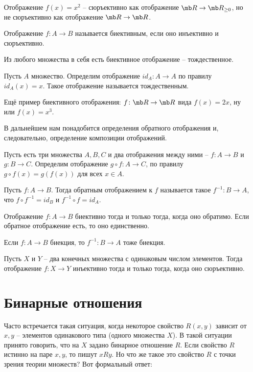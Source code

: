Отображение $f(x)=x^2$ -- сюръективно как отображение $\mb R \to \mb R_{\geq 0}$, но не сюръективно как отображение $\mb R \to \mb R$.

\dfn Отображение $f \colon A \to B$ называется биективным, если оно инъективно и сюръективно.
\edfn



Из любого множества в себя есть биективное отображение -- тождественное.



\dfn Пусть $A$ множество. Определим отображение $id_A \colon A \to A$ по правилу $id_A(x)=x$. Такое отображение называется тождественным.
\edfn

Ещё пример биективного отображения: $f \colon \mb R \to \mb R$ вида $f(x)=2x$, ну или $f(x)=x^3$.


В дальнейшем нам понадобится определения обратного отображения и, следовательно, определение композиции отображений.

\dfn Пусть есть три множества $A,B,C$ и два отображения между ними -- $f\colon A \to B$ и $g\colon B \to C$. Определим отображение $g \circ f \colon A \to C$, по правилу $g\circ f(x)= g(f(x))$ для всех $x \in A$. 
\edfn

\dfn Пусть $f \colon A \to B$. Тогда обратным отображением к $f$ называется такое $f^{-1}\colon B \to A$, что $f \circ f^{-1}= id_B$ и $f^{-1}\circ f= id_A$. 
\edfn



\thrm Отображение $f \colon A \to B$ биективно тогда и только тогда, когда оно обратимо. Если обратное отображение есть, то оно единственно.
\ethrm

\crl Если $f \colon A \to B$ биекция, то $f^{-1}\colon B \to A$ тоже биекция.
\ecrl

 Пусть $X$ и $Y$ -- два конечных множества с одинаковым числом элементов. Тогда отображение  $f\colon X \to Y$ инъективно тогда и только тогда, когда оно сюръективно.
\ethrm




\section{Бинарные отношения}

Часто встречается такая ситуация, когда некоторое свойство $R(x,y)$ зависит от $x,y$ -- элементов одинакового типа (одного множества $X$). В такой ситуации принято говорить, что на $X$ задано бинарное отношение $R$. Если свойство $R$ истинно на паре $x,y$, то пишут $x R y$. Но что же такое это свойство $R$ с точки зрения теории множеств? Вот формальный ответ:

